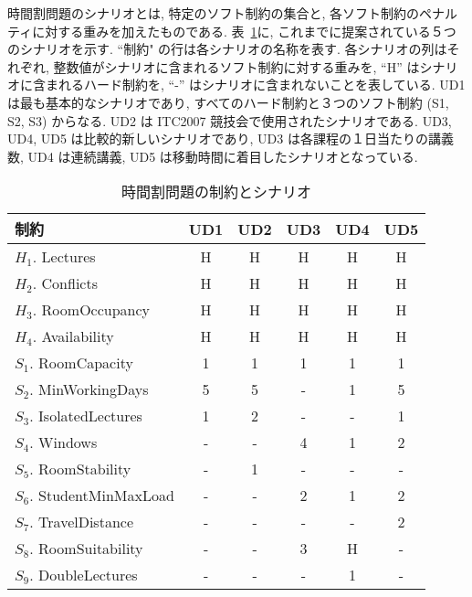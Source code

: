 時間割問題のシナリオとは, 特定のソフト制約の集合と, 各ソフト制約のペナルティに対する重みを加えたものである. 表~\ref{table:const}に, これまでに提案されている５つのシナリオを示す. ``制約" の行は各シナリオの名称を表す. 各シナリオの列はそれぞれ, 整数値がシナリオに含まれるソフト制約に対する重みを, “H” はシナリオに含まれるハード制約を, “-” はシナリオに含まれないことを表している. UD1 は最も基本的なシナリオであり, すべてのハード制約と３つのソフト制約 (S1, S2, S3) からなる. UD2 は ITC2007 競技会で使用されたシナリオである. UD3, UD4, UD5 は比較的新しいシナリオであり, UD3 は各課程の１日当たりの講義数, UD4 は連続講義, UD5 は移動時間に着目したシナリオとなっている.

\begin{table}
\caption{時間割問題の制約とシナリオ}
\label{table:const}
\begin{tabular}{l|ccccc}\hline
  制約                     			 &  UD1  &  UD2  &  UD3  &  UD4  &  UD5  \\
  \hline
  $H_1$. Lectures       		  &  H    &  H    &  H    &  H    &  H    \\
  $H_2$. Conflicts        		  &  H    &  H    &  H    &  H    &  H    \\
  $H_3$. RoomOccupancy 	  &  H    &  H    &  H    &  H    &  H    \\
  $H_4$. Availability       	 	  &  H    &  H    &  H    &  H    &  H    \\
  \hline
  $S_1$. RoomCapacity     	 &  1    &  1    &  1    &  1    &  1    \\
  $S_2$. MinWorkingDays  	 &  5    &  5    &  -    &  1    &  5    \\
  $S_3$. IsolatedLectures  	 &  1    &  2    &  -    &  -    &  1    \\
  $S_4$. Windows              	 &  -    &  -    &  4    &  1    &  2    \\
  $S_5$. RoomStability      	 &  -    &  1    &  -    &  -    &  -    \\
  $S_6$. StudentMinMaxLoad    &  -    &  -    &  2    &  1    &  2    \\
  $S_7$. TravelDistance 	    	 &  -    &  -    &  -    &  -    &  2    \\
  $S_8$. RoomSuitability   	 &  -    &  -    &  3    &  H    &  -    \\
  $S_9$. DoubleLectures     	 &  -    &  -    &  -    &  1    &  - \\
  \hline
\end{tabular}
\end{table}
  

